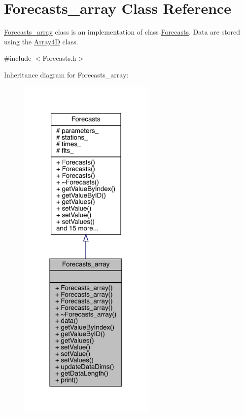 \hypertarget{class_forecasts__array}{}\section{Forecasts\+\_\+array Class Reference}
\label{class_forecasts__array}


\mbox{\hyperlink{class_forecasts__array}{Forecasts\+\_\+array}} class is an implementation of class \mbox{\hyperlink{class_forecasts}{Forecasts}}. Data are stored using the \mbox{\hyperlink{class_array4_d}{Array4D}} class.  




{\ttfamily \#include $<$Forecasts.\+h$>$}



Inheritance diagram for Forecasts\+\_\+array\+:\nopagebreak
\begin{figure}[H]
\begin{center}
\leavevmode
\includegraphics[width=189pt]{class_forecasts__array__inherit__graph}
\end{center}
\end{figure}


